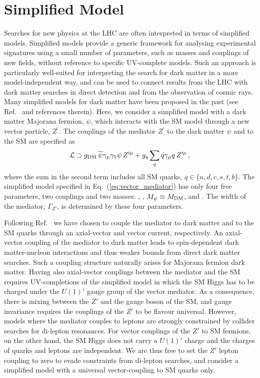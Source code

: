 \documentclass[floatfix]{article}
\begin{document}
\section{Simplified Model}\label{sec:model}
Searches for new physics at the LHC are often interpreted in terms of simplified models. Simplified models provide a generic 
framework for analysing experimental signatures using a small number of parameters, such as masses and 
couplings of new fields, without reference to specific UV-complete models. Such an  approach is particularly 
well-suited for interpreting the search for dark matter in a more model-independent way, and can be used to connect results from the LHC with 
dark matter searches in direct detection and from the observation of cosmic rays. Many simplified models for dark matter have been proposed 
in the past (see Ref.~\cite{Abercrombie:2015wmb} and references therein). Here, we consider a simplified model with a dark matter Majorana 
fermion, $\psi$, which interacts with the SM model through a new vector particle, $Z^\prime$. The couplings of the mediator $Z^\prime$ to 
the dark matter $\psi$ and to the 
SM are specified as %
\begin{align}\label{eq:vector_mediator}
 {\cal L} \supset  g_{\rm DM}\,\overline{\psi} \gamma_{\mu}\gamma_5 \psi\,Z'^{\mu} + g_{q}\sum_{q} \bar q \gamma_{\mu} q \,Z'^{\mu} \,,
\end{align}
%
where the sum in the second term includes all SM quarks, $q \in \{u,d,c,s,t,b\}$. The simplified model specified in Eq.~(\ref{eq:vector_mediator}) 
has only four free parameters, two couplings and two masses: \GDM, \GQ, $M_\psi \equiv M_{\rm DM}$, and \MZP. The width of the mediator, 
$\Gamma_{Z'}$, is determined by these four parameters. 

Following Ref.~\cite{Kahlhoefer:2015bea} we have chosen to couple the mediator to 
dark matter and to the SM quarks through an axial-vector and vector current, respectively. An axial-vector coupling of the 
mediator to dark matter leads to spin-dependent dark matter-nucleon interactions and thus weaker bounds from direct dark matter searches. 
Such a coupling structure naturally arises for Majorana fermion dark matter. Having also axial-vector couplings between
the mediator and the SM  requires UV-completions of the simplified model in which the SM Higgs has to be charged under 
the $U(1)'$ gauge group of the vector mediator. As a consequence, there is mixing between the $Z'$ and the gauge boson of the SM, and gauge invariance 
requires the couplings of the $Z'$ to be flavour universal. However, models where the mediator couples to leptons 
are strongly constrained by collider searches for di-lepton resonances. For vector couplings of the $Z'$ to  SM fermions, on the other hand, 
the SM Higgs does not carry a $U(1)'$ charge and the charges of quarks and leptons are independent. We are thus free to set the 
$Z'$ lepton coupling to zero to evade constraints from di-lepton searches, and consider a simplified model with a universal vector-coupling 
to SM quarks only. 
\end{document}
